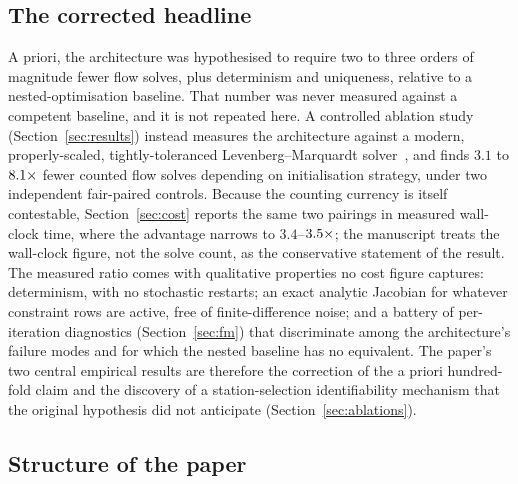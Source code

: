 \subsection{The corrected headline}
\label{sec:headline}

A priori, the architecture was hypothesised to require two to three orders of
magnitude fewer flow solves, plus determinism and uniqueness, relative to a
nested-optimisation baseline. That number was never measured against a
competent baseline, and it is not repeated here. A controlled ablation study
(Section~\ref{sec:results}) instead measures the architecture against a modern,
properly-scaled, tightly-toleranced Levenberg--Marquardt
solver~\citep{virtanen2020scipy}, and finds $3.1$ to $8.1\times$ fewer counted
flow solves depending on initialisation strategy, under two independent
fair-paired controls. Because the counting currency is itself contestable,
Section~\ref{sec:cost} reports the same two pairings in measured wall-clock
time, where the advantage narrows to $3.4$--$3.5\times$; the manuscript treats the
wall-clock figure, not the solve count, as the conservative statement of the
result. The measured ratio comes with qualitative properties no cost figure
captures: determinism, with no stochastic restarts; an exact analytic Jacobian
for whatever constraint rows are active, free of finite-difference noise; and
a battery of per-iteration diagnostics (Section~\ref{sec:fm}) that discriminate
among the architecture's failure modes and for which the nested baseline has
no equivalent. The paper's two central empirical results are therefore the
correction of the a priori hundred-fold claim and the discovery of a
station-selection identifiability mechanism that the original hypothesis did
not anticipate (Section~\ref{sec:ablations}).

\subsection{Structure of the paper}

